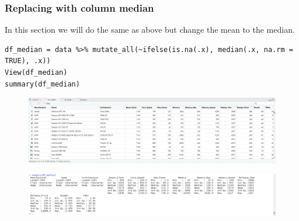 \documentclass[a4paper]{article}
\begin{document}
\subsubsection{Replacing with column median}
In this section we will do the same as above but change the mean to the median.
\begin{mdframed}[leftline=false,rightline=false,backgroundcolor=lightblue!10,nobreak=false]
    \begin{verbatim}
df_median = data %>% mutate_all(~ifelse(is.na(.x), median(.x, na.rm = TRUE), .x))       
View(df_median)
summary(df_median)
    \end{verbatim}
\end{mdframed}
\begin{figure}[H]
    \centering
    \includegraphics[keepaspectratio, width=1\textwidth, height=1\textheight]{Clean/df_median.png}
\end{figure}
\begin{figure}[H]
    \centering
    \includegraphics[keepaspectratio, width=1\textwidth, height=1\textheight]{Clean/df_median_summary.png}
\end{figure}
\end{document}
